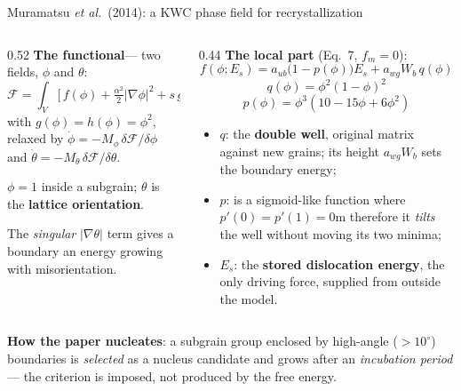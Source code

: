 \documentclass[10pt,aspectratio=169]{beamer}
\begin{document}
\begin{frame}{Muramatsu \emph{et al.}~(2014): a KWC phase field for recrystallization}
  \footnotesize
  \begin{columns}[T]
    \begin{column}{0.52\textwidth}
      \textbf{The functional}\footnotemark[7] --- two fields, $\phi$ and $\theta$:
      \[ \mathcal{F} = \int_V \Big[\, f(\phi) + \tfrac{\alpha^2}{2}|\nabla\phi|^2
         + s\,g(\phi)\,|\nabla\theta| + \tfrac{\epsilon^2}{2}\,h(\phi)\,|\nabla\theta|^2
         \Big]\,\mathrm{d}V \]
      with $g(\phi) = h(\phi) = \phi^2$, relaxed by
      $\dot\phi = -M_\phi\,\delta\mathcal{F}/\delta\phi$ and
      $\dot\theta = -M_\theta\,\delta\mathcal{F}/\delta\theta$.

      $\phi = 1$ inside a subgrain; $\theta$ is the
      \textbf{lattice orientation}. 
      
      The \emph{singular} $|\nabla\theta|$ term gives a boundary
      an energy growing with misorientation.
    \end{column}
    \begin{column}{0.44\textwidth}
      \textbf{The local part} (Eq.~7, $f_m = 0$):
      \[ f(\phi;E_s) = a_{ub}\big(1-p(\phi)\big)E_s + a_{wg}W_b\,q(\phi) \]
      \[ q(\phi) = \phi^2(1-\phi)^2 \]
      \[ p(\phi) = \phi^3(10-15\phi+6\phi^2) \]

        \scriptsize
      \begin{itemize}
        \item $q$: the \textbf{double well}, original matrix against new grains; its height $a_{wg}W_b$
          sets the boundary energy;
        \item $p$: is a sigmoid-like function where $p'(0)=p'(1)=0$m therefore it \emph{tilts} the well without
          moving its two minima;
        \item $E_s$: the \textbf{stored dislocation energy}, the only driving force, supplied
          from outside the model.
      \end{itemize}
    \end{column}
  \end{columns}
  \textbf{How the paper nucleates}: a subgrain group enclosed by high-angle ($>10^\circ$)
  boundaries is \emph{selected} as a nucleus candidate and grows after an \emph{incubation
  period} --- the criterion is \alert{imposed}, not produced by the free energy.
\end{frame}
\end{document}
